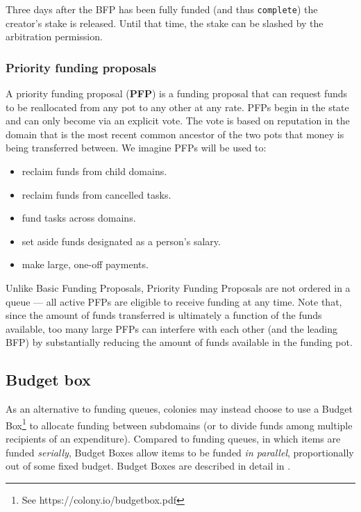 Three days after the BFP has been fully funded (and thus \texttt{complete}) the creator's stake is released. Until that time, the stake can be slashed by the arbitration permission.

\subsubsection{Priority funding proposals}
A priority funding proposal (\textbf{PFP}) is a funding proposal that can request funds to be reallocated from any pot to any other at any rate. PFPs begin in the  state and can only become  via an explicit vote. The vote is based on reputation in the domain that is the most recent common ancestor of the two pots that money is being transferred between. We imagine PFPs will be used to:

\begin{itemize}
 \item reclaim funds from child domains.
 \item reclaim funds from cancelled tasks.
 \item fund tasks across domains.
 \item set aside funds designated as a person's salary.
 \item make large, one-off payments.
 \end{itemize}

Unlike Basic Funding Proposals, Priority Funding Proposals are not ordered in a queue --- all active PFPs are eligible to receive funding at any time. Note that, since the amount of funds transferred is ultimately a function of the funds available, too many large PFPs can interfere with each other (and the leading BFP) by substantially reducing the amount of funds available in the funding pot.

\subsection{Budget box}\label{sec:budget-box}

As an alternative to funding queues, colonies may instead choose to use a Budget Box\footnote{See https://colony.io/budgetbox.pdf} to allocate funding between subdomains (or to divide funds among multiple recipients of an expenditure). Compared to funding queues, in which items are funded \textit{serially}, Budget Boxes allow items to be funded \textit{in parallel}, proportionally out of some fixed budget. Budget Boxes are described in detail in \cite{BudgetBox}. \\

